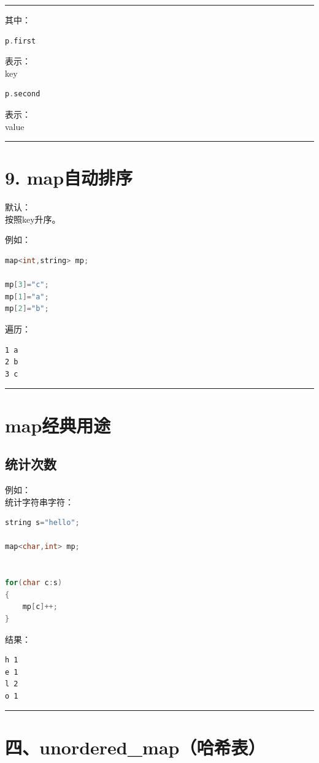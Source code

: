\documentclass[9pt,twocolumn]{extarticle}
\begin{document}
\noindent\rule{\linewidth}{0.4pt}

其中：
\begin{lstlisting}[language=C++]
p.first
\end{lstlisting}
表示：\\
key

\begin{lstlisting}[language=C++]
p.second
\end{lstlisting}
表示：\\
value

\noindent\rule{\linewidth}{0.4pt}

\section{9. map自动排序}

默认：\\
按照key升序。

例如：
\begin{lstlisting}[language=C++]
map<int,string> mp;

mp[3]="c";
mp[1]="a";
mp[2]="b";
\end{lstlisting}
遍历：
\begin{lstlisting}
1 a
2 b
3 c
\end{lstlisting}

\noindent\rule{\linewidth}{0.4pt}

\section{map经典用途}

\subsection{统计次数}
例如：\\
统计字符串字符：
\begin{lstlisting}[language=C++]
string s="hello";

map<char,int> mp;


for(char c:s)
{
    mp[c]++;
}
\end{lstlisting}
结果：
\begin{lstlisting}
h 1
e 1
l 2
o 1
\end{lstlisting}

\noindent\rule{\linewidth}{0.4pt}

\section{四、unordered\_map（哈希表）}
\end{document}
